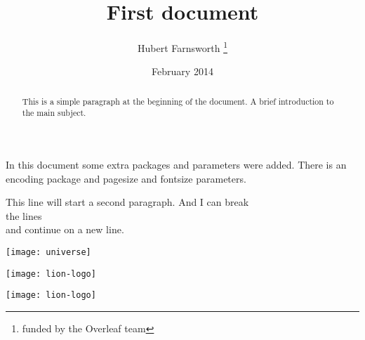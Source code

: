 \documentclass[12pt,letterpaper]{article}
\title{First document}
\author{Hubert Farnsworth \thanks{funded by the Overleaf team}}
\date{February 2014}
\begin{document}
\begin{titlepage}
\maketitle


\begin{abstract}
This is a simple paragraph at the beginning of the document. A brief introduction to the main subject.
\end{abstract}

\end{titlepage}

In this document some extra packages and parameters
were added. There is an encoding package
and pagesize and fontsize parameters.


This line will start a second paragraph. And I can
 break\\ the lines \\ and continue on a new line.

\begin{comment}
This text won't show up in the compiled pdf
this is just a multi-line comment. Useful
to, for instance, comment out slow-rendering parts
while working on a draft.
\end{comment}



\texttt{[image: universe]}

\texttt{[image: lion-logo]}

\texttt{[image: lion-logo]}


\begin{comment}
3 important commands: 
\caption{a nice plot}:set the caption for the figure.You can place it above or below the figure. Above: \caption{} first,then \texttt{[image: ]}. Below: \texttt{[image: ]} first, then \caption{}.
\label{fig:mesh1}:If you need to refer the image within your document,set a label with this command.The label will number the image.
\ref{fig:mesh1}: Refer the image in your document. It will be substituted by the number corresponding to the referenced figure.

\end{comment}
\end{document}
